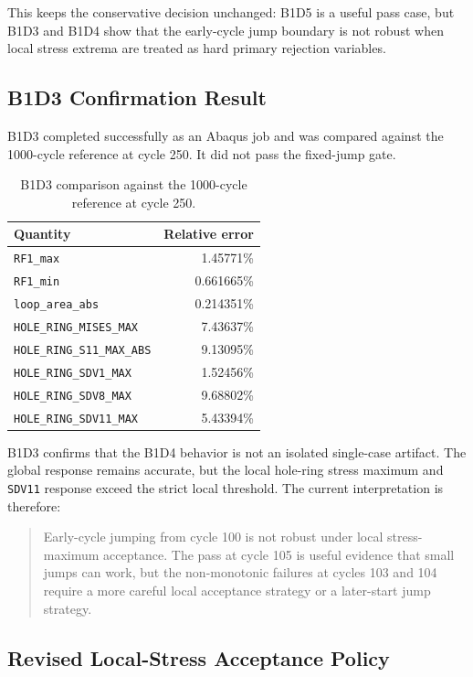 \documentclass[11pt,a4paper]{article}
\newcommand{\code}[1]{\texttt{#1}}
\begin{document}
This keeps the conservative decision unchanged: B1D5 is a useful pass case, but B1D3 and B1D4 show that the early-cycle jump boundary is not robust when local stress extrema are treated as hard primary rejection variables.

\subsection{B1D3 Confirmation Result}

B1D3 completed successfully as an Abaqus job and was compared against the 1000-cycle reference at cycle 250. It did not pass the fixed-jump gate.

\begin{table}[H]
\centering
\caption{B1D3 comparison against the 1000-cycle reference at cycle 250.}
\begin{tabular}{lr}
\toprule
Quantity & Relative error \\
\midrule
\code{RF1\_max} & 1.45771\% \\
\code{RF1\_min} & 0.661665\% \\
\code{loop\_area\_abs} & 0.214351\% \\
\code{HOLE\_RING\_MISES\_MAX} & 7.43637\% \\
\code{HOLE\_RING\_S11\_MAX\_ABS} & 9.13095\% \\
\code{HOLE\_RING\_SDV1\_MAX} & 1.52456\% \\
\code{HOLE\_RING\_SDV8\_MAX} & 9.68802\% \\
\code{HOLE\_RING\_SDV11\_MAX} & 5.43394\% \\
\bottomrule
\end{tabular}
\end{table}

B1D3 confirms that the B1D4 behavior is not an isolated single-case artifact. The global response remains accurate, but the local hole-ring stress maximum and \code{SDV11} response exceed the strict local threshold. The current interpretation is therefore:

\begin{quote}
Early-cycle jumping from cycle 100 is not robust under local stress-maximum acceptance. The pass at cycle 105 is useful evidence that small jumps can work, but the non-monotonic failures at cycles 103 and 104 require a more careful local acceptance strategy or a later-start jump strategy.
\end{quote}

\subsection{Revised Local-Stress Acceptance Policy}
\end{document}
